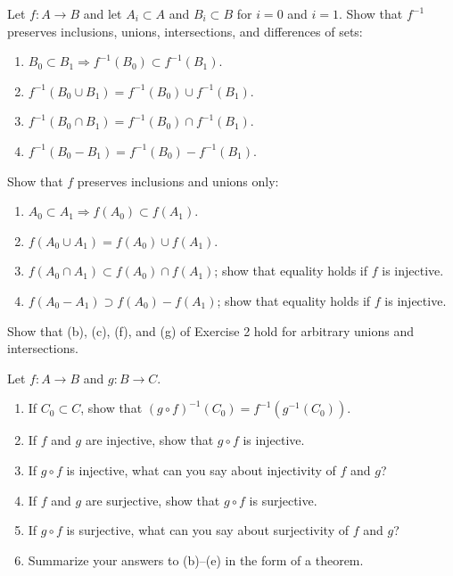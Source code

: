   \begin{exercise}[Munkres 2.2]
    Let $f: A \to B$ and let $A_i \subset A$ and $B_i \subset B$ for $i = 0$ and $i = 1$. Show that $f^{-1}$ preserves inclusions, unions, intersections, and differences of sets:
    \begin{enumerate}
      \item $B_0 \subset B_1 \Rightarrow f^{-1}(B_0) \subset f^{-1}(B_1)$.
      \item $f^{-1}(B_0 \cup B_1) = f^{-1}(B_0) \cup f^{-1}(B_1)$.
      \item $f^{-1}(B_0 \cap B_1) = f^{-1}(B_0) \cap f^{-1}(B_1)$.
      \item $f^{-1}(B_0 - B_1) = f^{-1}(B_0) - f^{-1}(B_1)$.
    \end{enumerate}
    Show that $f$ preserves inclusions and unions only:
    \begin{enumerate}[resume]
      \item $A_0 \subset A_1 \Rightarrow f(A_0) \subset f(A_1)$.
      \item $f(A_0 \cup A_1) = f(A_0) \cup f(A_1)$.
      \item $f(A_0 \cap A_1) \subset f(A_0) \cap f(A_1)$; show that equality holds if $f$ is injective.
      \item $f(A_0 - A_1) \supset f(A_0) - f(A_1)$; show that equality holds if $f$ is injective.
    \end{enumerate}
  \end{exercise}
  \begin{solution}
    
  \end{solution}

  \begin{exercise}[Munkres 2.3]
    Show that (b), (c), (f), and (g) of Exercise 2 hold for arbitrary unions and intersections.
  \end{exercise}
  \begin{solution}
    
  \end{solution}

  \begin{exercise}[Munkres 2.4]
    Let $f: A \to B$ and $g: B \to C$.
    \begin{enumerate}
      \item If $C_0 \subset C$, show that $(g \circ f)^{-1}(C_0) = f^{-1}(g^{-1}(C_0))$.
      \item If $f$ and $g$ are injective, show that $g \circ f$ is injective.
      \item If $g \circ f$ is injective, what can you say about injectivity of $f$ and $g$?
      \item If $f$ and $g$ are surjective, show that $g \circ f$ is surjective.
      \item If $g \circ f$ is surjective, what can you say about surjectivity of $f$ and $g$?
      \item Summarize your answers to (b)--(e) in the form of a theorem.
    \end{enumerate}
  \end{exercise}
  \begin{solution}
    
  \end{solution}

